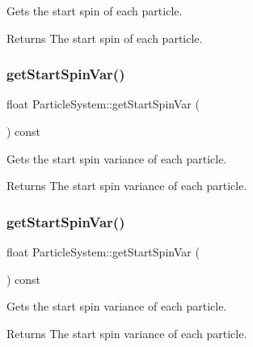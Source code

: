 Gets the start spin of each particle.

\begin{DoxyReturn}{Returns}
The start spin of each particle. 
\end{DoxyReturn}
\mbox{\label{classParticleSystem_a651809def8e49f9e4a2acb9736fd4beb}} 
\subsubsection{\texorpdfstring{get\+Start\+Spin\+Var()}{getStartSpinVar()}\hspace{0.1cm}{\footnotesize\ttfamily [1/2]}}
{\footnotesize\ttfamily float Particle\+System\+::get\+Start\+Spin\+Var (\begin{DoxyParamCaption}{ }\end{DoxyParamCaption}) const\hspace{0.3cm}{\ttfamily [inline]}}

Gets the start spin variance of each particle.

\begin{DoxyReturn}{Returns}
The start spin variance of each particle. 
\end{DoxyReturn}
\mbox{\label{classParticleSystem_a651809def8e49f9e4a2acb9736fd4beb}} 
\subsubsection{\texorpdfstring{get\+Start\+Spin\+Var()}{getStartSpinVar()}\hspace{0.1cm}{\footnotesize\ttfamily [2/2]}}
{\footnotesize\ttfamily float Particle\+System\+::get\+Start\+Spin\+Var (\begin{DoxyParamCaption}{ }\end{DoxyParamCaption}) const\hspace{0.3cm}{\ttfamily [inline]}}

Gets the start spin variance of each particle.

\begin{DoxyReturn}{Returns}
The start spin variance of each particle. 
\end{DoxyReturn}
\mbox{\label{classParticleSystem_ae0ba129e971088a2d661b311f541fd10}} 
